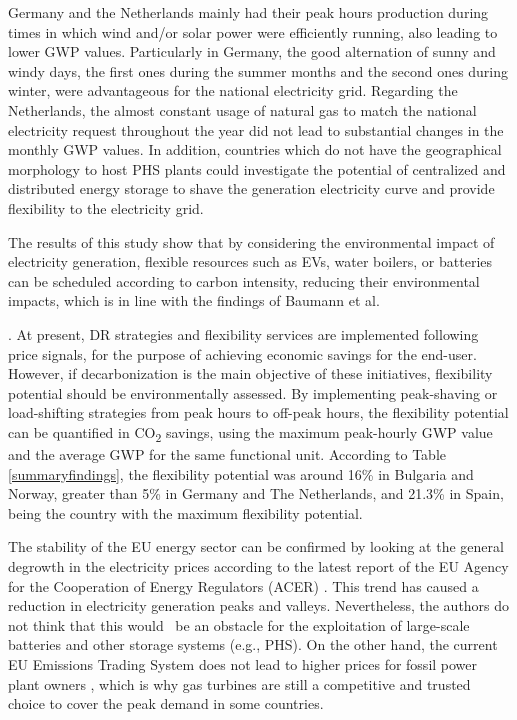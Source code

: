 {{{{{Germany and the Netherlands mainly had their peak hours production during times in which wind and/or solar power were efficiently running, also leading to lower  GWP values. Particularly in Germany, the good alternation of sunny and windy days, the first ones during the summer months and the second ones during winter, were advantageous for the national electricity grid. Regarding the Netherlands, the almost constant usage of natural gas to match the national electricity request throughout the year did not lead to substantial changes in the monthly GWP values. In addition, countries which do not have the geographical morphology to host PHS plants could investigate the potential of centralized and distributed energy storage to shave the generation electricity curve and provide flexibility to the electricity grid. 

The results of this study show that by considering the environmental impact of electricity generation, flexible resources such as EVs, water boilers, or batteries can be scheduled according to carbon intensity, reducing their environmental impacts, which is in line with the findings of Baumann et al. \cite{Baumann2019}}. At present, DR strategies and flexibility services are implemented following price signals, for the purpose of achieving economic savings for the end-user. However, if decarbonization is the main objective of these initiatives, flexibility potential should be environmentally assessed. By implementing peak-shaving or load-shifting strategies from peak hours to off-peak hours, the flexibility potential can be quantified in CO\textsubscript{2} savings, using the maximum peak-hourly GWP value and the average GWP for the same functional unit. According to Table \ref{summaryfindings}, the flexibility potential was around 16\% in Bulgaria and Norway, greater than 5\% in Germany and The Netherlands, and 21.3\% in Spain, being the country with the maximum flexibility potential.

The stability of the EU energy sector can be confirmed by looking at the general degrowth in the electricity prices according to the latest report of the EU Agency for the Cooperation of Energy Regulators (ACER) \cite{ACER2018}. This trend has caused a reduction in electricity generation peaks and valleys. Nevertheless, the authors do not think that this would%
~be an obstacle for the exploitation of large-scale batteries and other storage systems (e.g., PHS). On the other hand, the current EU Emissions Trading System does not lead to higher prices for fossil power plant owners \cite{DEANE20101293}, which is why gas turbines are still a competitive and trusted choice to cover the peak demand in some countries.

}}}}
